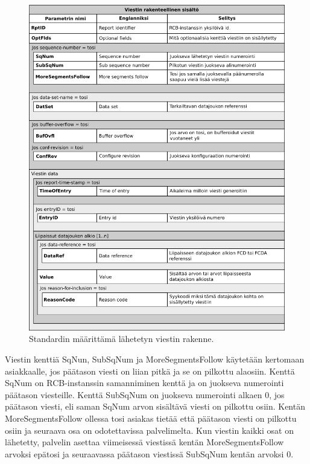 \begin{figure}
	\includegraphics[width=1\textwidth]{pictures/iec61850-report-format.png}
	\caption{Standardin määrittämä lähetetyn viestin rakenne.}
	\label{fig:iec61850-report-format}
\end{figure}

Viestin kenttiä SqNun, SubSqNum ja MoreSegmentsFollow käytetään kertomaan asiakkaalle, jos päätason viesti on liian pitkä ja se on pilkottu alaosiin. Kenttä SqNum on RCB-instanssin samanniminen kenttä ja on juokseva numerointi päätason viesteille. Kenttä SubSqNum on juokseva numerointi alkaen 0, jos päätason viesti, eli saman SqNum arvon sisältävä viesti on pilkottu osiin. Kentän MoreSegmentsFollow ollessa tosi asiakas tietää että päätason viesti on pilkottu osiin ja seuraava osa on odotettavissa palvelimelta. Kun viestin kaikki osat on lähetetty, palvelin asettaa viimeisessä viestissä kentän MoreSegmentsFollow arvoksi epätosi ja seuraavassa päätason viestissä SubSqNum kentän arvoksi 0. \cite[s.~105--106]{IEC61850-7-2}

